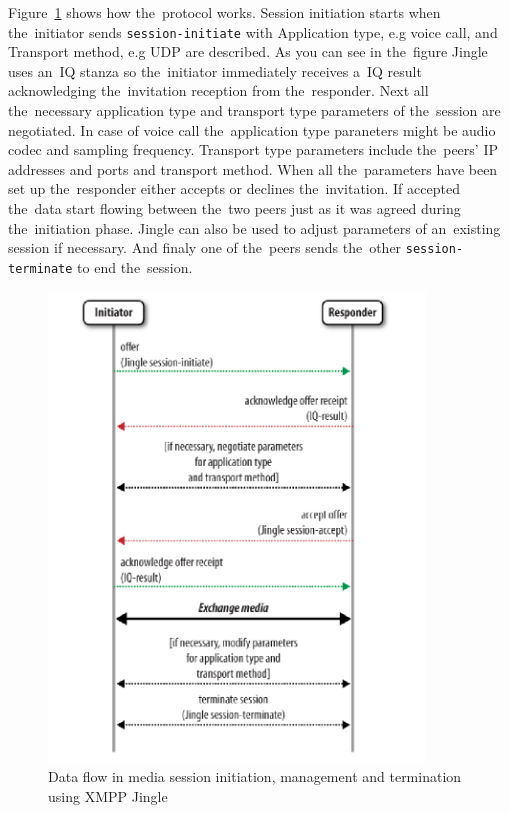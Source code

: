 Figure~\ref{fig:xmppJingleDataFlow} shows how the~protocol works. Session initiation starts when the~initiator sends \verb|session-initiate| with Application type, e.g voice call, and Transport method, e.g UDP are described. As you can see in the~figure Jingle uses an~IQ stanza so the~initiator immediately receives a~IQ result acknowledging the~invitation reception from the~responder. Next all the~necessary application type and transport type parameters of the~session are negotiated. In case of voice call the~application type paraneters might be audio codec and sampling frequency. Transport type parameters include the~peers' IP addresses and ports and transport method. When all the~parameters have been set up the~responder either accepts or declines the~invitation. If accepted the~data start flowing between the~two peers just as it was agreed during the~initiation phase. Jingle can also be used to adjust parameters of an~existing session if necessary. And finaly one of the~peers sends the~other \verb|session-terminate| to end the~session. 

\begin{figure}[ht]
\begin{center}
	\includegraphics[width=10cm]{fig/xmpp-jingle-flow.png}
	\caption{Data flow in media session initiation, management and termination using XMPP Jingle \cite{xmppBook}}
	\label{fig:xmppJingleDataFlow}
\end{center}
\end{figure}


